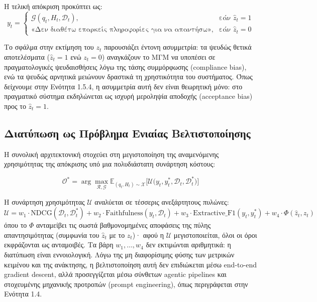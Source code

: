 Η τελική απόκριση προκύπτει ως:
\begin{equation}
y_t = 
\begin{cases}
\mathcal{G}(q_t, H_t, \mathcal{D}_t), & \text{εάν } \hat{z}_t = 1 \\
\text{«Δεν διαθέτω επαρκείς πληροφορίες για να απαντήσω»}, & \text{εάν } \hat{z}_t = 0
\end{cases}
\end{equation}

Το σφάλμα στην εκτίμηση του $z_t$ παρουσιάζει έντονη ασυμμετρία: τα ψευδώς θετικά αποτελέσματα ($\hat{z}_t=1$ ενώ $z_t=0$) αναγκάζουν το ΜΓΜ να υποπέσει σε πραγματολογικές ψευδαισθήσεις λόγω της τάσης συμμόρφωσης (compliance bias), ενώ τα ψευδώς αρνητικά μειώνουν δραστικά τη χρηστικότητα του συστήματος. Όπως δείχνουμε στην Ενότητα 1.5.4, η ασυμμετρία αυτή δεν είναι θεωρητική μόνο: στο πραγματικό σύστημα εκδηλώνεται ως ισχυρή μεροληψία αποδοχής (acceptance bias) προς το $\hat{z}_t=1$.

\subsection{Διατύπωση ως Πρόβλημα Ενιαίας Βελτιστοποίησης}

Η συνολική αρχιτεκτονική στοχεύει στη μεγιστοποίηση της αναμενόμενης χρησιμότητας της απόκρισης υπό μια πολυδιάστατη συνάρτηση κόστους:

\begin{equation}
\mathcal{O}^* = \arg\max_{\mathcal{R}, \mathcal{G}} \mathbb{E}_{(q_t, H_t) \sim \mathcal{X}} \Big[ \mathcal{U}\big(y_t, y_t^*, \mathcal{D}_t, \mathcal{D}_t^*\big) \Big]
\end{equation}

Η συνάρτηση χρησιμότητας $\mathcal{U}$ αναλύεται σε τέσσερις ανεξάρτητους πυλώνες:
\begin{equation}
\mathcal{U} = w_1 \cdot \text{NDCG}(\mathcal{D}_t, \mathcal{D}_t^*) + w_2 \cdot \text{Faithfulness}(y_t, \mathcal{D}_t) + w_3 \cdot \text{Extractive\_F1}(y_t, y_t^*) + w_4 \cdot \Phi(\hat{z}_t, z_t)
\end{equation}
όπου το $\Phi$ ανταμείβει τις σωστά βαθμονομημένες αποφάσεις της πύλης απαντησιμότητας (συμφωνία του $\hat{z}_t$ με το $z_t$)· αφού η $\mathcal{U}$ μεγιστοποιείται, όλοι οι όροι εκφράζονται ως ανταμοιβές. Τα βάρη $w_1, \dots, w_4$ δεν εκτιμώνται αριθμητικά: η διατύπωση είναι εννοιολογική. Λόγω της μη διαφορίσιμης φύσης των μετρικών κειμένου και της ανάκτησης, η βελτιστοποίηση αυτή δεν επιδιώκεται μέσω end-to-end gradient descent, αλλά προσεγγίζεται μέσω σύνθετων agentic pipelines και στοχευμένης μηχανικής προτροπών (prompt engineering), όπως περιγράφεται στην Ενότητα 1.4.

